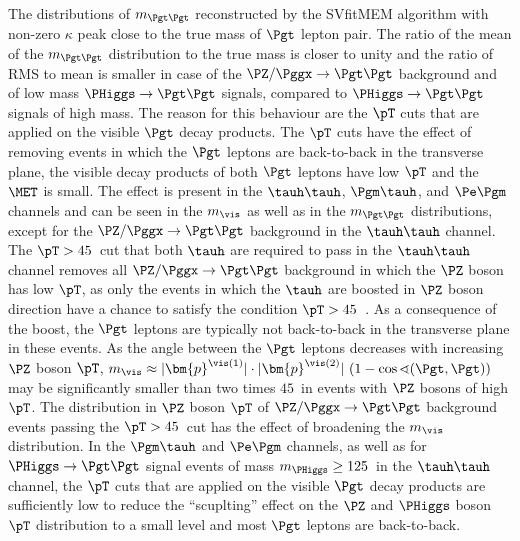 The distributions of $m_{\Pgt\Pgt}$ reconstructed by the SVfitMEM algorithm with non-zero $\kappa$ 
peak close to the true mass of $\Pgt$ lepton pair.
The ratio of the mean of the $m_{\Pgt\Pgt}$ distribution to the true mass is closer to unity and the ratio of RMS to mean is smaller
in case of the $\PZ/\Pggx \to \Pgt\Pgt$ background and of low mass $\PHiggs \to \Pgt\Pgt$ signals, compared to $\PHiggs \to \Pgt\Pgt$ signals of high mass.
The reason for this behaviour are the $\pT$ cuts that are applied on the visible $\Pgt$ decay products.
The $\pT$ cuts have the effect of removing events in which the $\Pgt$ leptons are back-to-back in the transverse plane,
the visible decay products of both $\Pgt$ leptons have low $\pT$ and the $\MET$ is small.
The effect is present in the $\tauh\tauh$, $\Pgm\tauh$, and $\Pe\Pgm$ channels and can be seen in the $m_{\vis}$ as well as in the $m_{\Pgt\Pgt}$ distributions,
except for the $\PZ/\Pggx \to \Pgt\Pgt$ background in the $\tauh\tauh$ channel.
The $\pT > 45$~\GeV cut that both $\tauh$ are required to pass in the $\tauh\tauh$ channel removes all $\PZ/\Pggx \to \Pgt\Pgt$ background in which the $\PZ$ boson has low $\pT$,
as only the events in which the $\tauh$ are boosted in $\PZ$ boson direction have a chance to satisfy the condition $\pT > 45$~\GeV.
As a consequence of the boost, the $\Pgt$ leptons are typically not back-to-back in the transverse plane in these events.
As the angle between the $\Pgt$ leptons decreases with increasing $\PZ$ boson $\pT$,
$m_{\vis} \approx \vert\bm{p}^{\vis(1)}\vert \cdot \vert\bm{p}^{\vis(2)}\vert \, \left( 1 - \cos\sphericalangle(\Pgt,\Pgt) \right)$
may be significantly smaller than two times $45$~\GeV in events with $\PZ$ bosons of high $\pT$.
The distribution in $\PZ$ boson $\pT$ of $\PZ/\Pggx \to \Pgt\Pgt$ background events passing the $\pT > 45$~\GeV cut
has the effect of broadening the $m_{\vis}$ distribution.
In the $\Pgm\tauh$ and $\Pe\Pgm$ channels, as well as for $\PHiggs \to \Pgt\Pgt$ signal events of mass $m_{\PHiggs} \geq 125$~\GeV in the $\tauh\tauh$ channel,
the $\pT$ cuts that are applied on the visible $\Pgt$ decay products 
are sufficiently low to reduce the ``scuplting'' effect on the $\PZ$ and $\PHiggs$ boson $\pT$ distribution to a small level 
and most $\Pgt$ leptons are back-to-back.

